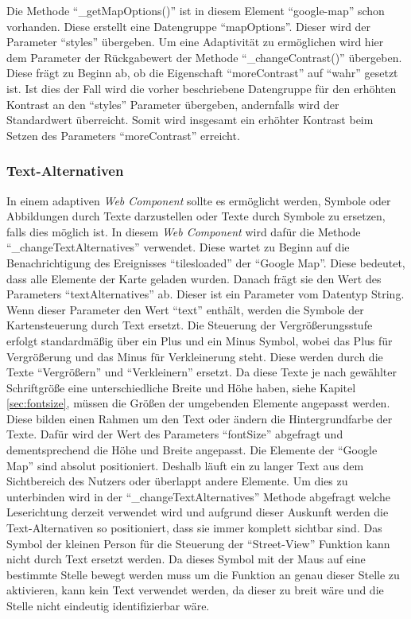 \documentclass[12pt, paper=a4, bibtotoc, toc=listof, headsepline=true]{scrreprt}
\begin{document}
		Die Methode \enquote{\_getMapOptions()} ist in diesem Element \enquote{google-map} schon vorhanden. Diese erstellt eine Datengruppe \enquote{mapOptions}. Dieser wird der Parameter \enquote{styles} übergeben. Um eine Adaptivität zu ermöglichen wird hier dem Parameter der Rückgabewert der Methode \enquote{\_changeContrast()} übergeben. Diese frägt zu Beginn ab, ob die Eigenschaft \enquote{moreContrast} auf \enquote{wahr} gesetzt ist. Ist dies der Fall wird die vorher beschriebene Datengruppe für den erhöhten Kontrast an den \enquote{styles} Parameter übergeben, andernfalls wird der Standardwert überreicht. Somit wird insgesamt ein erhöhter Kontrast beim Setzen des Parameters \enquote{moreContrast} erreicht.
		\subsubsection{Text-Alternativen}
		In einem adaptiven \emph{Web Component} sollte es ermöglicht werden, Symbole oder Abbildungen durch Texte darzustellen oder Texte durch Symbole zu ersetzen, falls dies möglich ist. In diesem \emph{Web Component} wird dafür die Methode \enquote{\_changeTextAlternatives} verwendet. Diese wartet zu Beginn auf die Benachrichtigung des Ereignisses \enquote{tilesloaded} der \enquote{Google Map}. Diese bedeutet, dass alle Elemente der Karte geladen wurden. Danach frägt sie den Wert des Parameters \enquote{textAlternatives} ab. Dieser ist ein Parameter vom Datentyp String. Wenn dieser Parameter den Wert \enquote{text} enthält, werden die Symbole der Kartensteuerung durch Text ersetzt. Die Steuerung der Vergrößerungsstufe erfolgt standardmäßig über ein Plus und ein Minus Symbol, wobei das Plus für Vergrößerung und das Minus für Verkleinerung steht. Diese werden durch die Texte \enquote{Vergrößern} und \enquote{Verkleinern} ersetzt. Da diese Texte je nach gewählter Schriftgröße eine unterschiedliche Breite und Höhe haben, siehe Kapitel
		\ref{sec:fontsize}, müssen die Größen der umgebenden Elemente angepasst werden. Diese bilden einen Rahmen um den Text oder ändern die Hintergrundfarbe der Texte. Dafür wird der Wert des Parameters \enquote{fontSize} abgefragt und dementsprechend die Höhe und Breite angepasst. Die Elemente der \enquote{Google Map} sind absolut positioniert. Deshalb läuft ein zu langer Text aus dem Sichtbereich des Nutzers oder überlappt andere Elemente. Um dies zu unterbinden wird in der \enquote{\_changeTextAlternatives} Methode abgefragt welche Leserichtung derzeit verwendet wird und aufgrund dieser Auskunft werden die Text-Alternativen so positioniert, dass sie immer komplett sichtbar sind. Das Symbol der kleinen Person für die Steuerung der \enquote{Street-View} Funktion kann nicht durch Text ersetzt werden. Da dieses Symbol mit der Maus auf eine bestimmte Stelle bewegt werden muss um die Funktion an genau dieser Stelle zu aktivieren, kann kein Text verwendet werden, da dieser zu breit wäre und die Stelle nicht eindeutig identifizierbar wäre. 
\end{document}
